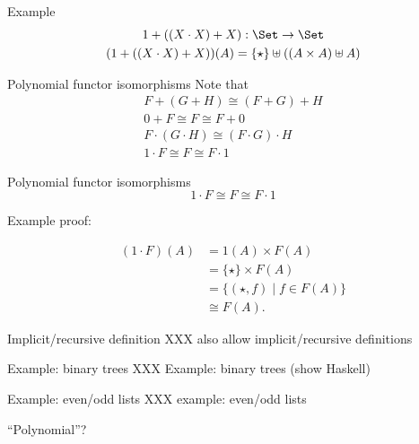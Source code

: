 \documentclass[xcolor=svgnames,12pt]{beamer}
\newenvironment{xframe}[1][]
  {\begin{frame}[fragile,environment=xframe,#1]}
  {\end{frame}}
\begin{document}
\begin{xframe}{Example}
  \begin{gather*}
    1 + ((X \cdot X) + X) : \Set \to \Set \\
    (1 + ((X \cdot X) + X))(A) = \{\star\} \uplus ((A \times A) \uplus A)
  \end{gather*}
\end{xframe}

\begin{xframe}{Polynomial functor isomorphisms}
  Note that
  \begin{gather*}
    F + (G + H) \cong (F + G) + H \\
    0 + F \cong F \cong F + 0 \\
    F \cdot (G \cdot H) \cong (F \cdot G) \cdot H \\
    1 \cdot F \cong F \cong F \cdot 1
  \end{gather*}
\end{xframe}

\begin{xframe}{Polynomial functor isomorphisms}
\[ 1 \cdot F \cong F \cong F \cdot 1 \]

Example proof:

  \begin{align*}
    (1 \cdot F)(A) &= 1(A) \times F(A) \\
    &= \{\star\} \times F(A) \\
    &= \{(\star, f) \mid f \in F(A)\} \\
    &\cong F(A).
  \end{align*}
\end{xframe}

\begin{xframe}{Implicit/recursive definition}
  XXX also allow implicit/recursive definitions
\end{xframe}

\begin{xframe}{Example: binary trees}
  XXX Example: binary trees
  (show Haskell)
\end{xframe}

\begin{xframe}{Example: even/odd lists}
  XXX example: even/odd lists
\end{xframe}

\begin{xframe}{``Polynomial''?}
  
\end{xframe}
\end{document}
